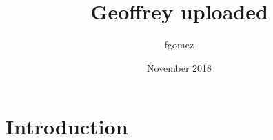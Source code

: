 \documentclass{article}
\title{Geoffrey uploaded}
\author{fgomez }
\date{November 2018}
\begin{document}
\maketitle

\section{Introduction}
\end{document}
